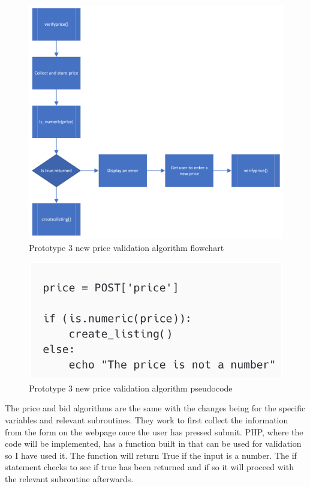  \begin{figure}
     \centering
     \includegraphics[scale=0.4]{ch3_developing/proto3/flow_price.png}
     \caption{Prototype 3 new price validation algorithm flowchart}
     \label{fig:proto3_flowprice}
 \end{figure}
 \begin{figure}[H]
     \centering
     \includegraphics[scale=0.4]{ch3_developing/proto3/price_integer.png}
     \caption{Prototype 3 new price validation algorithm pseudocode}
     \label{fig:proto3_priceinteger}
 \end{figure}
The price and bid algorithms are the same with the changes being for the specific variables and relevant subroutines. They work to first collect the information from the form on the webpage once the user has pressed submit. PHP, where the code will be implemented, has a function built in that can be used for validation so I have used it. The function will return True if the input is a number. The if statement checks to see if true has been returned and if so it will proceed with the relevant subroutine afterwards.

